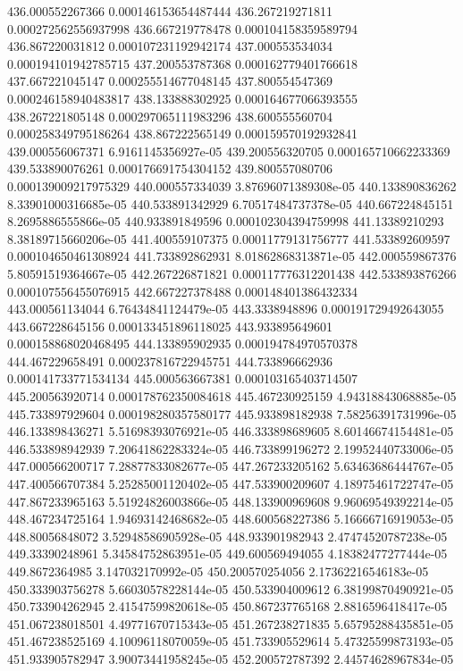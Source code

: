 {436.000552267366 0.000146153654487444
436.267219271811 0.000272562556937998
436.667219778478 0.000104158359589794
436.867220031812 0.000107231192942174
437.000553534034 0.000194101942785715
437.200553787368 0.000162779401766618
437.667221045147 0.000255514677048145
437.800554547369 0.000246158940483817
438.133888302925 0.000164677066393555
438.267221805148 0.000297065111983296
438.600555560704 0.000258349795186264
438.867222565149 0.000159570192932841
439.000556067371 6.9161145356927e-05
439.200556320705 0.000165710662233369
439.533890076261 0.000176691754304152
439.800557080706 0.000139009217975329
440.000557334039 3.87696071389308e-05
440.133890836262 8.33901000316685e-05
440.533891342929 6.70517484737378e-05
440.667224845151 8.2695886555866e-05
440.933891849596 0.000102304394759998
441.13389210293 8.38189715660206e-05
441.400559107375 0.00011779131756777
441.533892609597 0.000104650461308924
441.733892862931 8.01862868313871e-05
442.000559867376 5.80591519364667e-05
442.267226871821 0.000117776312201438
442.533893876266 0.000107556455076915
442.667227378488 0.000148401386432334
443.000561134044 6.76434841124479e-05
443.3338948896 0.000191729492643055
443.667228645156 0.000133451896118025
443.933895649601 0.000158868020468495
444.133895902935 0.000194784970570378
444.467229658491 0.000237816722945751
444.733896662936 0.000141733771534134
445.000563667381 0.000103165403714507
445.200563920714 0.000178762350084618
445.467230925159 4.94318843068885e-05
445.733897929604 0.000198280357580177
445.933898182938 7.58256391731996e-05
446.133898436271 5.51698393076921e-05
446.333898689605 8.60146674154481e-05
446.533898942939 7.20641862283324e-05
446.733899196272 2.19952440733006e-05
447.000566200717 7.28877833082677e-05
447.267233205162 5.63463686444767e-05
447.400566707384 5.25285001120402e-05
447.533900209607 4.18975461722747e-05
447.867233965163 5.51924826003866e-05
448.133900969608 9.96069549392214e-05
448.467234725164 1.94693142468682e-05
448.600568227386 5.16666716919053e-05
448.80056848072 3.52948586905928e-05
448.933901982943 2.47474520787238e-05
449.33390248961 5.34584752863951e-05
449.600569494055 4.18382477277444e-05
449.8672364985 3.147032170992e-05
450.200570254056 2.17362216546183e-05
450.333903756278 5.66030578228144e-05
450.533904009612 6.38199870490921e-05
450.733904262945 2.41547599820618e-05
450.867237765168 2.8816596418417e-05
451.067238018501 4.49771670715343e-05
451.267238271835 5.65795288435851e-05
451.467238525169 4.10096118070059e-05
451.733905529614 5.47325599873193e-05
451.933905782947 3.90073441958245e-05
452.200572787392 2.44574628967834e-05
}
